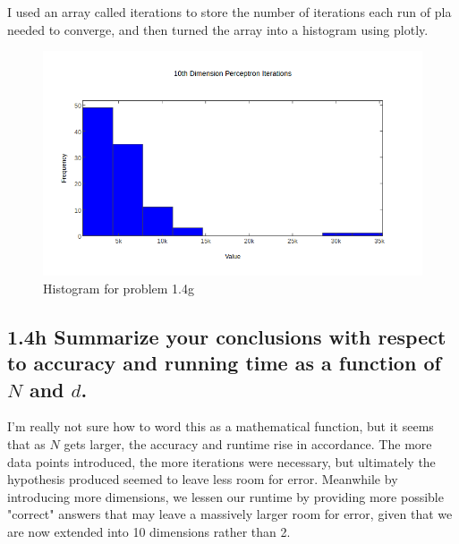\documentclass[11pt]{article}
\begin{document}
I used an array called iterations to store the number of iterations each run of pla needed to converge, and then turned the array into a histogram using plotly.

\begin{figure}[!htb]
	\includegraphics[scale=0.75]{Iterations.png}
	\caption{Histogram for problem 1.4g}
\end{figure}
\newpage

\subsection*{1.4h Summarize your conclusions with respect to accuracy and running time as a function of $N$ and $d$.}

I'm really not sure how to word this as a mathematical function, but it seems that as $N$ gets larger, the accuracy and runtime rise in accordance. The more data points introduced, the more iterations were necessary, but ultimately the hypothesis produced seemed to leave less room for error. Meanwhile by introducing more dimensions, we lessen our runtime by providing more possible "correct" answers that may leave a massively larger room for error, given that we are now extended into 10 dimensions rather than 2.
\end{document}

